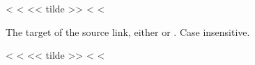 \documentclass[letterpaper,10pt,english]{sphinxmanual}
\begin{document}
\vspace{5px}

\begin{fulllineitems}
\label{\detokenize{confval:confval-source_link_target}}
<%
\pysigstartsignatures
<%
<< tilde >>
<%
<%
\vspace{-45px}

\begin{DUlineblock}{0em}
\item[]  
\item[]  
\item[]  
\end{DUlineblock}

\vspace{-25px}

The target of the source link, either  or .
Case insensitive.

\end{fulllineitems}



\vspace{5px}

\begin{fulllineitems}
\label{\detokenize{confval:confval-github_username}}
<%
\pysigstartsignatures
<%
<< tilde >>
<%
<%
\vspace{-45px}

\begin{DUlineblock}{0em}
\item[]  
\item[]  
\end{DUlineblock}

\end{fulllineitems}
\end{document}
